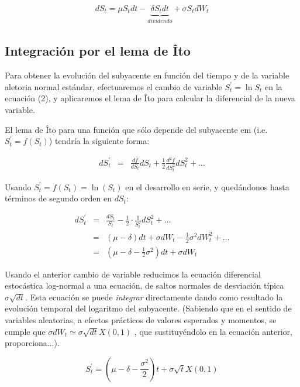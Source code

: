 \documentclass[12pt]{article}
\begin{document}
\begin{eqnarray}
	dS_{t} = \mu S_{t}dt - \underbrace{\delta S_{t}dt}_{dividendo} + \sigma S_{t}dW_{t}
\end{eqnarray}

\subsection{Integraci\'{o}n por el lema de \^{I}to}

Para obtener la evoluci\'{o}n del subyacente en funci\'{o}n del tiempo y de la variable aletoria normal est\'{a}ndar,
efectuaremos el cambio de variable $S^{'}_{t}=\ln S_{t}$ en la ecuaci\'{o}n (2), y aplicaremos el lema de \^{I}to para 
calcular la diferencial de la nueva variable.
\newline

El lema de \^{I}to para una funci\'{o}n que s\'{o}lo depende del subyacente {em (i.e.\ $S_{t}^{'}=f(S_{t})$)} tendr\'{i}a
la siguiente forma:
\newline

\begin{eqnarray}
	dS_{t}^{'} & = & \frac{df}{dS_{t}}dS_{t} + \frac{1}{2}\frac{d^{2}f}{dS_{t}^{2}}dS_{t}^{2} + \ldots
\end{eqnarray} 

Usando $S_{t}^{'} = f(S_{t}) = \ln(S_{t})$ en el desarrollo en serie, y qued\'{a}ndonos hasta t\'{e}rminos de segundo orden en $dS_{t}$:
\newline

\begin{eqnarray}
	dS_{t}^{'}	& = & \frac{dS_{t}}{S_{t}} - \frac{1}{2}\cdot\frac{1}{S_{t}^{2}}dS_{t}^{2} + \ldots \nonumber \\
			& = & \left( \mu - \delta \right) dt + \sigma dW_{t} - \frac{1}{2}\sigma^{2}dW_{t}^{2} + \ldots \nonumber \\
			& = & \left( \mu - \delta - \frac{1}{2}\sigma^{2} \right)dt + \sigma dW_{t} 		 
\end{eqnarray}

Usando el anterior cambio de variable reducimos la ecuaci\'{o}n diferencial estoc\'{a}stica log-normal a una ecuaci\'{o}n, de saltos normales de
desviaci\'{o}n t\'{i}pica $\sigma \sqrt{dt}$. Esta ecuaci\'{o}n se puede {\em integrar} directamente dando como resultado la evoluci\'{o}n
temporal del logaritmo del subyacente. (Sabiendo que en el sentido de variables aleatorias, a efectos pr\'{a}cticos de valores esperados y momentos, se cumple que $\sigma dW_{t} \simeq \sigma \sqrt{dt} X \left( 0,1 \right)$ , que sustituy\'{e}ndolo en la ecuaci\'{o}n anterior, proporciona...).
\newline

\begin{equation}
	S_{t}^{'} = \left(\mu - \delta - \frac{\sigma^{2}}{2}\right) t + \sigma\sqrt{t}X(0,1)
\end{equation}  
\end{document}

